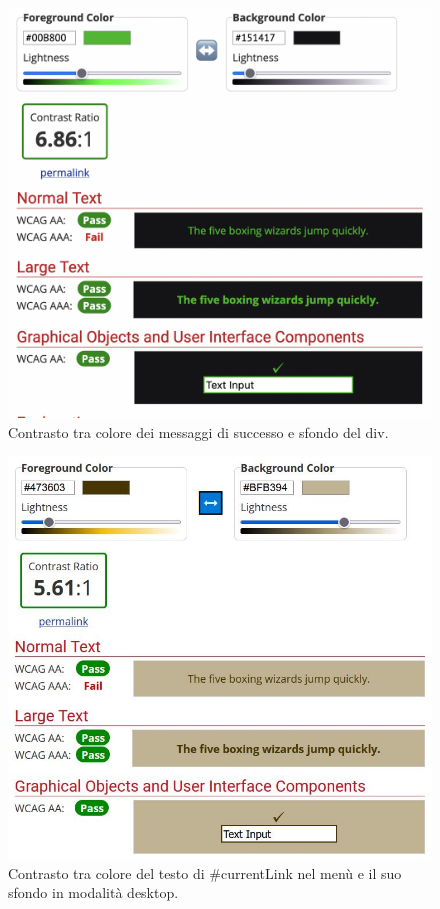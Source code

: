 \documentclass[a4paper]{article}
\begin{document}
	\begin{figure}[H]
		\centering
		\includegraphics[scale=0.3]{immagini/controllo-colori/dark-mode/successo_sfondo-div.png}
		\caption{Contrasto tra colore dei messaggi di successo e sfondo del div.}
	\end{figure}

	\begin{figure}[H]
		\centering
		\includegraphics[scale=0.35]{immagini/controllo-colori/dark-mode/testo-contrasto-sfondi_testo-principale.JPG}
		\caption{Contrasto tra colore del testo di \#currentLink nel menù e il suo sfondo in modalità desktop.}
	\end{figure}
\end{document}

